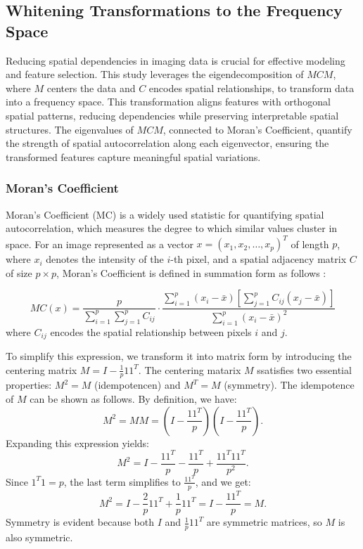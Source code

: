\documentclass[12pt]{article}
\begin{document}
\subsection{Whitening Transformations to the Frequency Space}

Reducing spatial dependencies in imaging data is crucial for effective modeling and feature selection. This study leverages the eigendecomposition of \( MCM \), where \( M \) centers the data and \( C \) encodes spatial relationships, to transform data into a frequency space. This transformation aligns features with orthogonal spatial patterns, reducing dependencies while preserving interpretable spatial structures. The eigenvalues of \( MCM \), connected to Moran’s Coefficient, quantify the strength of spatial autocorrelation along each eigenvector, ensuring the transformed features capture meaningful spatial variations.

\subsubsection{Moran’s Coefficient}

Moran’s Coefficient (MC) is a widely used statistic for quantifying spatial autocorrelation, which measures the degree to which similar values cluster in space. For an image represented as a vector \( x = (x_1, x_2, \dots, x_p)^T \) of length \( p \), where \( x_i \) denotes the intensity of the \( i \)-th pixel, and a spatial adjacency matrix \( C \) of size \( p \times p \), Moran’s Coefficient is defined in summation form as follows \citet{griffith2014spatial}:

\[
	M C(x) = \frac{p}{\sum_{i=1}^p \sum_{j=1}^p C_{ij}} \cdot \frac{\sum_{i=1}^p \left(x_i - \bar{x} \right) \left[ \sum_{j=1}^p C_{ij} \left( x_j - \bar{x} \right) \right]}{\sum_{i=1}^p \left( x_i - \bar{x} \right)^2}
\]
where \( C_{ij} \) encodes the spatial relationship between pixels \( i \) and \( j \).

To simplify this expression, we transform it into matrix form by introducing the centering matrix \( M = I - \frac{1}{p} 1 1^T \). The centering matarix \( M \) ssatisfies two essential properties: \( M^2 = M \) (idempotencen) and \( M^T = M \) (symmetry). The idempotence of \( M \) can be shown as follows. By definition, we have:
\[
	M^2 = M M = \left( I - \frac{1 1^T}{p} \right) \left( I - \frac{1 1^T}{p} \right).
\]
Expanding this expression yields:
\[
	M^2 = I - \frac{1 1^T}{p} - \frac{1 1^T}{p} + \frac{1 1^T 1 1^T}{p^2}.
\]
Since \( 1^T 1 = p \), the last term simplifies to \( \frac{1 1^T}{p} \), and we get:
\[
	M^2 = I - \frac{2}{p} 1 1^T + \frac{1}{p} 1 1^T = I - \frac{1 1^T}{p} = M.
\]
Symmetry is evident because both \( I \) and \( \frac{1}{p} 1 1^T \) are symmetric matrices, so \( M \) is also symmetric.
\end{document}
